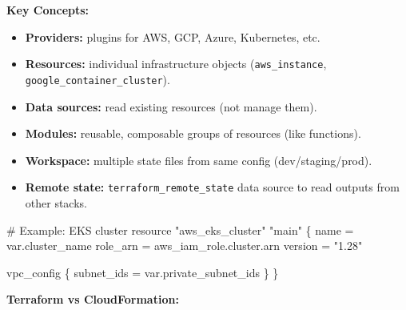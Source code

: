 \documentclass[11pt]{article}
\providecommand{\tightlist}{\setlength{\itemsep}{1pt}\setlength{\parskip}{0pt}}
\newenvironment{Shaded}{\begin{snugshade}}{\end{snugshade}}
\newcommand{\NormalTok}[1]{\textcolor[rgb]{0.81,0.81,0.76}{#1}}
\begin{document}
\textbf{Key Concepts:}

\begin{itemize}
\tightlist
\item
  \textbf{Providers:} plugins for AWS, GCP, Azure, Kubernetes, etc.
\item
  \textbf{Resources:} individual infrastructure objects (\texttt{aws\_instance}, \texttt{google\_container\_cluster}).
\item
  \textbf{Data sources:} read existing resources (not manage them).
\item
  \textbf{Modules:} reusable, composable groups of resources (like functions).
\item
  \textbf{Workspace:} multiple state files from same config (dev/staging/prod).
\item
  \textbf{Remote state:} \texttt{terraform\_remote\_state} data source to read outputs from other stacks.
\end{itemize}


\begin{Shaded}
\begin{Highlighting}[]
\NormalTok{\# Example: EKS cluster}
\NormalTok{resource "aws\_eks\_cluster" "main" \{}
\NormalTok{  name     = var.cluster\_name}
\NormalTok{  role\_arn = aws\_iam\_role.cluster.arn}
\NormalTok{  version  = "1.28"}

\NormalTok{  vpc\_config \{}
\NormalTok{    subnet\_ids = var.private\_subnet\_ids}
\NormalTok{  \}}
\NormalTok{\}}
\end{Highlighting}
\end{Shaded}

\textbf{Terraform vs CloudFormation:}
\end{document}
